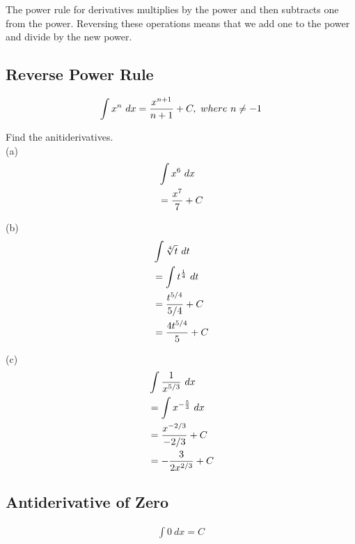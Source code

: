 The power rule for derivatives multiplies by the power and then subtracts one from the power. Reversing these operations means that we add one to the power and divide by the new power. \\

\subsection{Reverse Power Rule}

\begin{theorem}
    \begin{align}
        \int x^n \ dx = {x^{n+1} \over n+1} + C,\ where\ n \ne -1
    \end{align}
\end{theorem}

\begin{exercise}\nonumber
    Find the anitiderivatives. \\

    (a)
    \begin{align}
         & \int x^6 \ dx       \\
         & = {x^7 \over 7} + C \\
    \end{align}

    (b)
    \begin{align}
         & \int \sqrt[4]{t} \ dt       \\
         & = \int t^{1 \over 4} \ dt   \\
         & = {t^{5/4} \over {5/4}} + C \\
         & = {4t^{5/4} \over 5} + C    \\
    \end{align}

    (c)
    \begin{align}
         & \int {1 \over x^{5/3}} \ dx  \\
         & = \int x^{-{5 \over 3}} \ dx \\
         & = {x^{-2/3} \over -2/3} + C  \\
         & = -{3 \over 2x^{2/3}} + C
    \end{align}
\end{exercise}

\subsection{Antiderivative of Zero}

\begin{theorem}
    \begin{align}
        \int 0 \ dx = C
    \end{align}
\end{theorem}

